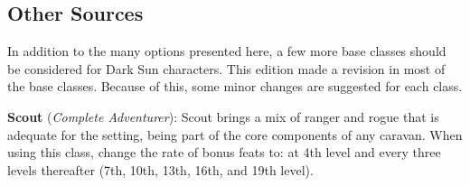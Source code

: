 
\subsection{Other Sources}
In addition to the many options presented here, a few more base classes should be considered for {\tableheader Dark Sun} characters. This edition made a revision in most of the base classes. Because of this, some minor changes are suggested for each class.

\textbf{Scout} (\emph{Complete Adventurer}): Scout brings a mix of ranger and rogue that is adequate for the setting, being part of the core components of any caravan. When using this class, change the rate of bonus feats to: at 4th level and every three levels thereafter (7th, 10th, 13th, 16th, and 19th level).



\clearpage



\vskip4cm




% 



% 

\clearpage



